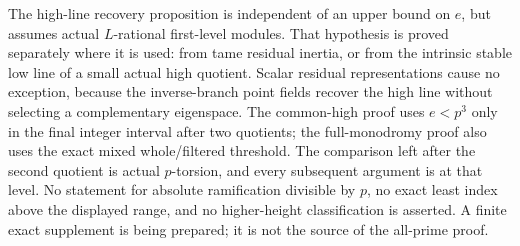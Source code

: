 \begin{remark}
\label{rem:B-RD73-scope}
The high-line recovery proposition is independent of an upper bound
on \(e\), but assumes actual \(L\)-rational first-level modules.
That hypothesis is proved separately where it is used: from tame
residual inertia, or from the intrinsic stable low line of a small
actual high quotient. Scalar residual representations cause no
exception, because the inverse-branch point fields recover the
high line without selecting a complementary eigenspace.
The common-high proof uses \(e<p^3\) only in the final integer
interval after two quotients; the full-monodromy proof also uses
the exact mixed whole/filtered threshold.
The comparison left after the second quotient is actual
\(p\)-torsion, and every subsequent argument is at that level.
No statement for absolute ramification divisible by \(p\),
no exact least index above the displayed range, and no higher-height
classification is asserted. A finite exact supplement is being
prepared; it is not the source of the all-prime proof.
\end{remark}
